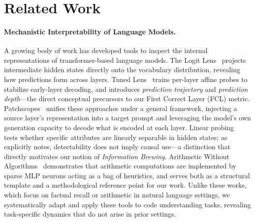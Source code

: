 \section{Related Work}
\label{sec:related_work}

\paragraph{Mechanistic Interpretability of Language Models.}
A growing body of work has developed tools to inspect the internal representations of transformer-based language models.
The Logit Lens~\citep{nostalgebraist2020} projects intermediate hidden states directly onto the vocabulary distribution, revealing how predictions form across layers.
Tuned Lens~\citep{belrose2023tunedlens} trains per-layer affine probes to stabilize early-layer decoding, and introduces \emph{prediction trajectory} and \emph{prediction depth}---the direct conceptual precursors to our First Correct Layer (FCL) metric.
Patchscopes~\citep{ghandeharioun2024patchscopes} unifies these approaches under a general framework, injecting a source layer's representation into a target prompt and leveraging the model's own generation capacity to decode what is encoded at each layer.
Linear probing~\citep{belinkov2022probing} tests whether specific attributes are linearly separable in hidden states; as \citet{belinkov2022probing} explicitly notes, detectability does not imply causal use---a distinction that directly motivates our notion of \emph{Information Brewing}.
Arithmetic Without Algorithms~\citep{nikankin2025arithmetic} demonstrates that arithmetic computations are implemented by sparse MLP neurons acting as a bag of heuristics, and serves both as a structural template and a methodological reference point for our work.
Unlike these works, which focus on factual recall or arithmetic in natural language settings, we systematically adapt and apply these tools to code understanding tasks, revealing task-specific dynamics that do not arise in prior settings.

